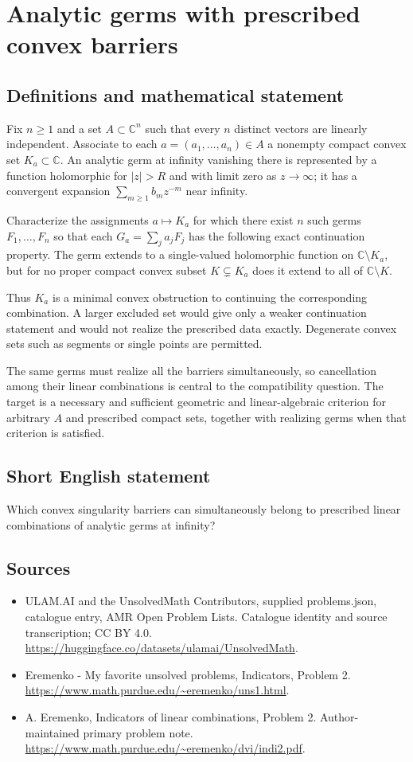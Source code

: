 \documentclass[11pt,a4paper]{article}
\begin{document}
\section*{Analytic germs with prescribed convex barriers}\label{statement}

\subsection{Definitions and mathematical statement}
Fix $n\geq1$ and a set $A\subset\mathbb C^n$ such that
every $n$ distinct vectors are linearly independent. Associate
to each $a=(a_1,\ldots,a_n)\in A$ a nonempty compact convex
set $K_a\subset\mathbb C$.
An analytic germ at infinity vanishing there is represented
by a function holomorphic for $|z|>R$ and with limit zero
as $z\to\infty$; it has a convergent expansion
$\sum_{m\geq1}b_mz^{-m}$ near infinity.

Characterize the assignments $a\mapsto K_a$ for which there
exist $n$ such germs $F_1,\ldots,F_n$ so that each
$G_a=\sum_ja_jF_j$ has the following exact continuation
property. The germ extends to a single-valued holomorphic
function on $\mathbb C\setminus K_a$, but for no proper
compact convex subset $K\subsetneq K_a$ does it extend
to all of $\mathbb C\setminus K$.

Thus $K_a$ is a minimal convex obstruction to continuing
the corresponding combination. A larger excluded set would
give only a weaker continuation statement and would not
realize the prescribed data exactly. Degenerate convex
sets such as segments or single points are permitted.

The same germs must realize all the barriers simultaneously,
so cancellation among their linear combinations is central
to the compatibility question. The target is a necessary
and sufficient geometric and linear-algebraic criterion for
arbitrary $A$ and prescribed compact sets, together with
realizing germs when that criterion is satisfied.
\subsection{Short English statement}
Which convex singularity barriers can simultaneously belong to prescribed linear combinations of analytic germs at infinity?
\subsection{Sources}
\begin{itemize}
\item[S1] ULAM.AI and the UnsolvedMath Contributors, supplied problems.json, catalogue entry, AMR Open Problem Lists. Catalogue identity and source transcription; CC BY 4.0.
\url{https://huggingface.co/datasets/ulamai/UnsolvedMath}.
\item[S2] Eremenko - My favorite unsolved problems, Indicators, Problem 2. 
\url{https://www.math.purdue.edu/~eremenko/uns1.html}.
\item[S3] A. Eremenko, Indicators of linear combinations, Problem 2. Author-maintained primary problem note.
\url{https://www.math.purdue.edu/~eremenko/dvi/indi2.pdf}.
\end{itemize}
\end{document}
